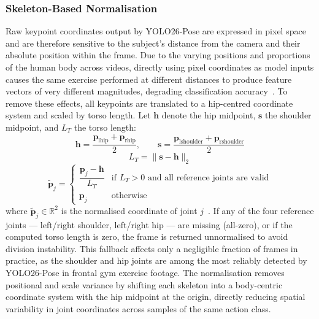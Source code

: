 \documentclass[conference,onecolumn,oneside]{IEEEtran}
\begin{document}
\subsubsection{Skeleton-Based Normalisation}
\vspace{0.5cm}
Raw keypoint coordinates output by YOLO26-Pose are expressed in pixel
space and are therefore sensitive to the subject's distance from the
camera and their absolute position within the frame. Due to the varying
positions and proportions of the human body across videos, directly using
pixel coordinates as model inputs causes the same exercise performed at
different distances to produce feature vectors of very different magnitudes,
degrading classification accuracy~\cite{10, 7}. To remove these effects,
all keypoints are translated to a hip-centred coordinate system and scaled
by torso length. Let $\mathbf{h}$ denote the hip midpoint, $\mathbf{s}$
the shoulder midpoint, and $L_T$ the torso length:
\begin{equation}
\mathbf{h} = \frac{\mathbf{p}_{\text{lhip}} + \mathbf{p}_{\text{rhip}}}{2},
\qquad
\mathbf{s} = \frac{\mathbf{p}_{\text{lshoulder}} +
\mathbf{p}_{\text{rshoulder}}}{2}
\end{equation}
\begin{equation}
L_T = \|\mathbf{s} - \mathbf{h}\|_2
\end{equation}
\begin{equation}
\tilde{\mathbf{p}}_j =
\begin{cases}
\dfrac{\mathbf{p}_j - \mathbf{h}}{L_T} & \text{if } L_T > 0
\text{ and all reference joints are valid} \\[8pt]
\mathbf{p}_j & \text{otherwise}
\end{cases}
\end{equation}
where $\tilde{\mathbf{p}}_j \in \mathbb{R}^2$ is the normalised coordinate
of joint $j$~\cite{10, 7}. If any of the four reference joints ---
left/right shoulder, left/right hip --- are missing (all-zero), or if the
computed torso length is zero, the frame is returned unnormalised to avoid
division instability. This fallback affects only a negligible fraction of
frames in practice, as the shoulder and hip joints are among the most
reliably detected by YOLO26-Pose in frontal gym exercise footage. The
normalisation removes positional and scale variance by shifting each
skeleton into a body-centric coordinate system with the hip midpoint at
the origin, directly reducing spatial variability in joint coordinates
across samples of the same action class.
\end{document}
